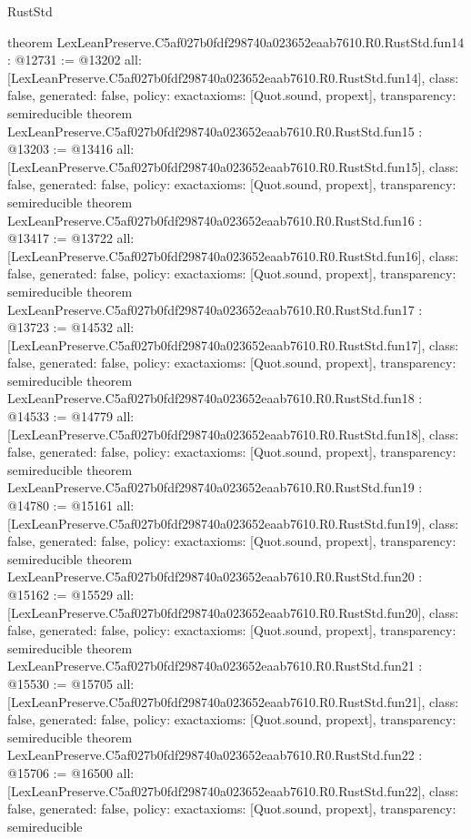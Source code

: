 \begin{lexlean}{RustStd}
\begin{coremodule}
{}
theorem LexLeanPreserve.C5af027b0fdf298740a023652eaab7610.R0.RustStd.fun14 : @12731 := @13202 {
  all: [LexLeanPreserve.C5af027b0fdf298740a023652eaab7610.R0.RustStd.fun14],
  class: false,
  generated: false,
  policy: exact{axioms: [Quot.sound, propext]},
  transparency: semireducible
}
theorem LexLeanPreserve.C5af027b0fdf298740a023652eaab7610.R0.RustStd.fun15 : @13203 := @13416 {
  all: [LexLeanPreserve.C5af027b0fdf298740a023652eaab7610.R0.RustStd.fun15],
  class: false,
  generated: false,
  policy: exact{axioms: [Quot.sound, propext]},
  transparency: semireducible
}
theorem LexLeanPreserve.C5af027b0fdf298740a023652eaab7610.R0.RustStd.fun16 : @13417 := @13722 {
  all: [LexLeanPreserve.C5af027b0fdf298740a023652eaab7610.R0.RustStd.fun16],
  class: false,
  generated: false,
  policy: exact{axioms: [Quot.sound, propext]},
  transparency: semireducible
}
theorem LexLeanPreserve.C5af027b0fdf298740a023652eaab7610.R0.RustStd.fun17 : @13723 := @14532 {
  all: [LexLeanPreserve.C5af027b0fdf298740a023652eaab7610.R0.RustStd.fun17],
  class: false,
  generated: false,
  policy: exact{axioms: [Quot.sound, propext]},
  transparency: semireducible
}
theorem LexLeanPreserve.C5af027b0fdf298740a023652eaab7610.R0.RustStd.fun18 : @14533 := @14779 {
  all: [LexLeanPreserve.C5af027b0fdf298740a023652eaab7610.R0.RustStd.fun18],
  class: false,
  generated: false,
  policy: exact{axioms: [Quot.sound, propext]},
  transparency: semireducible
}
theorem LexLeanPreserve.C5af027b0fdf298740a023652eaab7610.R0.RustStd.fun19 : @14780 := @15161 {
  all: [LexLeanPreserve.C5af027b0fdf298740a023652eaab7610.R0.RustStd.fun19],
  class: false,
  generated: false,
  policy: exact{axioms: [Quot.sound, propext]},
  transparency: semireducible
}
theorem LexLeanPreserve.C5af027b0fdf298740a023652eaab7610.R0.RustStd.fun20 : @15162 := @15529 {
  all: [LexLeanPreserve.C5af027b0fdf298740a023652eaab7610.R0.RustStd.fun20],
  class: false,
  generated: false,
  policy: exact{axioms: [Quot.sound, propext]},
  transparency: semireducible
}
theorem LexLeanPreserve.C5af027b0fdf298740a023652eaab7610.R0.RustStd.fun21 : @15530 := @15705 {
  all: [LexLeanPreserve.C5af027b0fdf298740a023652eaab7610.R0.RustStd.fun21],
  class: false,
  generated: false,
  policy: exact{axioms: [Quot.sound, propext]},
  transparency: semireducible
}
theorem LexLeanPreserve.C5af027b0fdf298740a023652eaab7610.R0.RustStd.fun22 : @15706 := @16500 {
  all: [LexLeanPreserve.C5af027b0fdf298740a023652eaab7610.R0.RustStd.fun22],
  class: false,
  generated: false,
  policy: exact{axioms: [Quot.sound, propext]},
  transparency: semireducible
}
\end{coremodule}
\end{lexlean}
